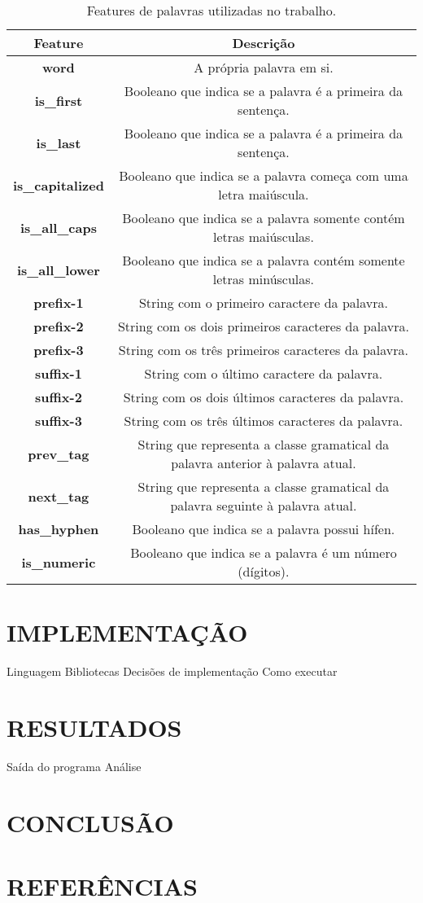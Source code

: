 \documentclass[12pt]{article}
\begin{document}
\begin{table}[h]
	\centering
	\begin{tabular}{|c|c|}
		\hline
		\textbf{Feature} & \textbf{Descrição} \\ \hline
		\textbf{word} & A própria palavra em si. \\ \hline
		\textbf{is\_first} & Booleano que indica se a palavra é a primeira da sentença. \\ \hline
		\textbf{is\_last} & Booleano que indica se a palavra é a primeira da sentença. \\ \hline
		\textbf{is\_capitalized} & Booleano que indica se a palavra começa com uma letra maiúscula. \\ \hline
		\textbf{is\_all\_caps} & Booleano que indica se a palavra somente contém
		letras maiúsculas. \\ \hline
		\textbf{is\_all\_lower} & Booleano que indica se a palavra contém somente
		letras minúsculas. \\ \hline
		\textbf{prefix-1} & String com o primeiro caractere da palavra. \\ \hline
		\textbf{prefix-2} & String com os dois primeiros caracteres da palavra. \\ \hline
		\textbf{prefix-3} & String com os três primeiros caracteres da palavra. \\ \hline
		\textbf{suffix-1} & String com o último caractere da palavra. \\ \hline
		\textbf{suffix-2} & String com os dois últimos caracteres da palavra. \\ \hline
		\textbf{suffix-3} & String com os três últimos caracteres da palavra. \\ \hline
		\textbf{prev\_tag} & String que representa a classe gramatical da palavra
		anterior à palavra atual. \\ \hline
		\textbf{next\_tag} & String que representa a classe gramatical da palavra
		seguinte à palavra atual. \\ \hline
		\textbf{has\_hyphen} & Booleano que indica se a palavra possui hífen.
		\\ \hline
		\textbf{is\_numeric} & Booleano que indica se a palavra é um número
		(dígitos). \\ \hline
	\end{tabular}
	\caption{\label{tab:features} Features de palavras utilizadas no trabalho.}
\end{table}

\section{IMPLEMENTAÇÃO}

Linguagem
Bibliotecas
Decisões de implementação
Como executar

\section{RESULTADOS}

Saída do programa
Análise

\section{CONCLUSÃO}



\section{REFERÊNCIAS}



\end{document}
